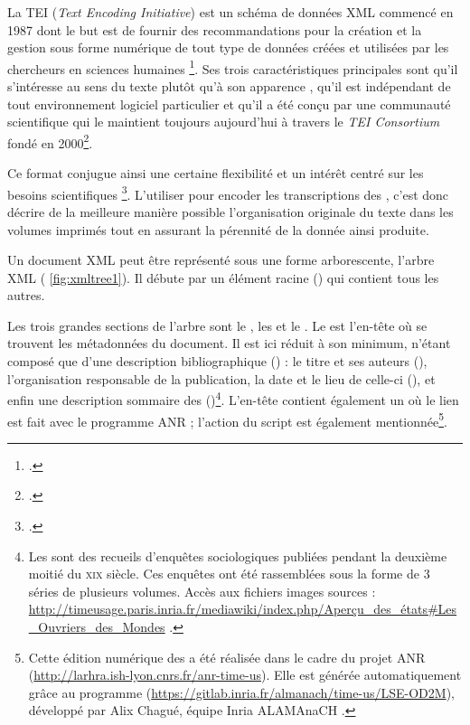 La TEI (\textit{Text Encoding Initiative}) est un schéma de données XML commencé en 1987 dont le but est de \og fournir des recommandations pour la création et la gestion sous forme numérique de tout type de données créées et utilisées par les chercheurs en sciences humaines \fg\footcite[p. 9]{burnard}. Ses trois caractéristiques principales sont qu'il \og s’intéresse au sens du texte plutôt qu'à son apparence \fg, qu'il est \og indépendant de tout environnement logiciel particulier \fg{} et qu'il a été conçu par une communauté scientifique qui le maintient toujours aujourd'hui à travers le \textit{TEI Consortium} fondé en 2000\footcite[p. 9]{burnard}. 

Ce format conjugue ainsi une certaine \og flexibilité et un intérêt centré sur les besoins scientifiques \fg\footcite[p. 10]{burnard}. L'utiliser pour encoder les transcriptions des \odm, c'est donc décrire de la meilleure manière possible l'organisation originale du texte dans les volumes imprimés tout en assurant la pérennité de la donnée ainsi produite.

Un document XML peut être représenté sous une forme arborescente, \og l'arbre XML \fg{} (\fig{} \ref{fig:xmltree1}). Il débute par un élément racine () qui contient tous les autres.

Les trois grandes sections de l'arbre sont le , les  et le . Le  est l'en-tête où se trouvent les métadonnées du document. Il est ici réduit à son minimum, n'étant composé que d'une description bibliographique () : le titre et ses auteurs (), l'organisation responsable de la publication, la date et le lieu de celle-ci (), et enfin une description sommaire des \odm{} ()\footnote{\og Les \odm{} sont des recueils d'enquêtes sociologiques publiées pendant la deuxième moitié du \textsc{xix}\ieme{} siècle. Ces enquêtes ont été rassemblées sous la forme de 3 séries de plusieurs volumes. Accès aux fichiers images sources : \url{http://timeusage.paris.inria.fr/mediawiki/index.php/Aperçu_des_états\#Les_Ouvriers_des_Mondes} \fg.}. L'en-tête contient également un  où le lien est fait avec le programme ANR ; l'action du script \lse{} est également mentionnée\footnote{\og Cette édition numérique des \odm{} a été réalisée dans le cadre du projet ANR \timeus{} (\url{http://larhra.ish-lyon.cnrs.fr/anr-time-us}). Elle est générée automatiquement grâce au programme \lse{} (\url{https://gitlab.inria.fr/almanach/time-us/LSE-OD2M}), développé par Alix Chagué, équipe Inria ALAMAnaCH \fg.}.

